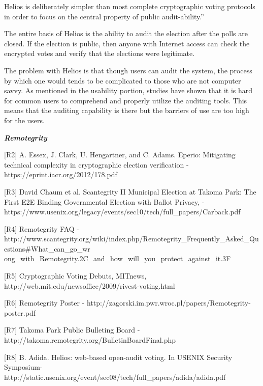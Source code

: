 Helios is deliberately simpler than most complete cryptographic voting protocols in order to focus on the central property of public audit-ability.''~\cite{adida2008}

The entire basis of Helios is the ability to audit the election after the polls are closed. If the election is public, then anyone with Internet access can check the encrypted votes and verify that the elections were legitimate.

The problem with Helios is that though users can audit the system, the process by which one would tends to be complicated to those who are not computer savvy. As mentioned in the usability portion, studies have shown that it is hard for common users to comprehend and properly utilize the auditing tools. This means that the auditing capability is there but the barriers of use are too high for the users.

\textbf{\textit{Remotegrity}}

[R2] A. Essex, J. Clark, U. Hengartner, and C. Adams. Eperio: Mitigating technical complexity in cryptographic election verification - \textcolor[rgb]{0.078431375,0.3254902,0.6901961}{https://eprint.iacr.org/2012/178.pdf}

[R3] David Chaum et al. Scantegrity II Municipal Election at Takoma Park: The First E2E Binding Governmental Election with Ballot Privacy, - \textcolor[rgb]{0.078431375,0.3254902,0.6901961}{https://www.usenix.org/legacy/events/sec10/tech/full\_papers/Carback.pdf}

[R4] Remotegrity FAQ -\textcolor[rgb]{0.078431375,0.3254902,0.6901961}{http://www.scantegrity.org/wiki/index.php/Remotegrity\_Frequently\_Asked\_Questions\#What\_can\_go\_wr ong\_with\_Remotegrity.2C\_and\_how\_will\_you\_protect\_against\_it.3F}

[R5] Cryptographic Voting Debuts, MITnews, \textcolor[rgb]{0.078431375,0.3254902,0.6901961}{http://web.mit.edu/newsoffice/2009/rivest-voting.html}

[R6] Remotegrity Poster - \textcolor[rgb]{0.078431375,0.3254902,0.6901961}{http://zagorski.im.pwr.wroc.pl/papers/Remotegrity-poster.pdf}

[R7] Takoma Park Public Bulleting Board - \textcolor[rgb]{0.078431375,0.3254902,0.6901961}{http://takoma.remotegrity.org/BulletinBoardFinal.php}

[R8] B. Adida. Helios: web-based open-audit voting. In USENIX Security Symposium-\textcolor[rgb]{0.078431375,0.3254902,0.6901961}{http://static.usenix.org/event/sec08/tech/full\_papers/adida/adida.pdf}


